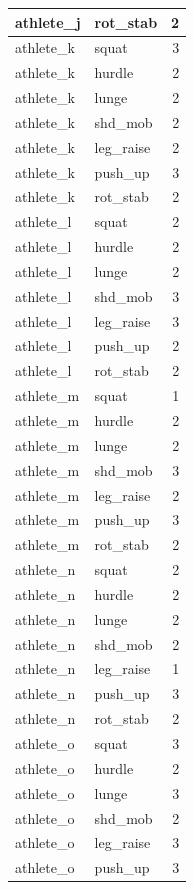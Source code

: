 \documentclass[
]{book}
\begin{document}
\begin{tabular}{l|l|r}
\hline
athlete\_j & rot\_stab & 2\\
\hline
athlete\_k & squat & 3\\
\hline
athlete\_k & hurdle & 2\\
\hline
athlete\_k & lunge & 2\\
\hline
athlete\_k & shd\_mob & 2\\
\hline
athlete\_k & leg\_raise & 2\\
\hline
athlete\_k & push\_up & 3\\
\hline
athlete\_k & rot\_stab & 2\\
\hline
athlete\_l & squat & 2\\
\hline
athlete\_l & hurdle & 2\\
\hline
athlete\_l & lunge & 2\\
\hline
athlete\_l & shd\_mob & 3\\
\hline
athlete\_l & leg\_raise & 3\\
\hline
athlete\_l & push\_up & 2\\
\hline
athlete\_l & rot\_stab & 2\\
\hline
athlete\_m & squat & 1\\
\hline
athlete\_m & hurdle & 2\\
\hline
athlete\_m & lunge & 2\\
\hline
athlete\_m & shd\_mob & 3\\
\hline
athlete\_m & leg\_raise & 2\\
\hline
athlete\_m & push\_up & 3\\
\hline
athlete\_m & rot\_stab & 2\\
\hline
athlete\_n & squat & 2\\
\hline
athlete\_n & hurdle & 2\\
\hline
athlete\_n & lunge & 2\\
\hline
athlete\_n & shd\_mob & 2\\
\hline
athlete\_n & leg\_raise & 1\\
\hline
athlete\_n & push\_up & 3\\
\hline
athlete\_n & rot\_stab & 2\\
\hline
athlete\_o & squat & 3\\
\hline
athlete\_o & hurdle & 2\\
\hline
athlete\_o & lunge & 3\\
\hline
athlete\_o & shd\_mob & 2\\
\hline
athlete\_o & leg\_raise & 3\\
\hline
athlete\_o & push\_up & 3\\

\end{tabular}
\end{document}
